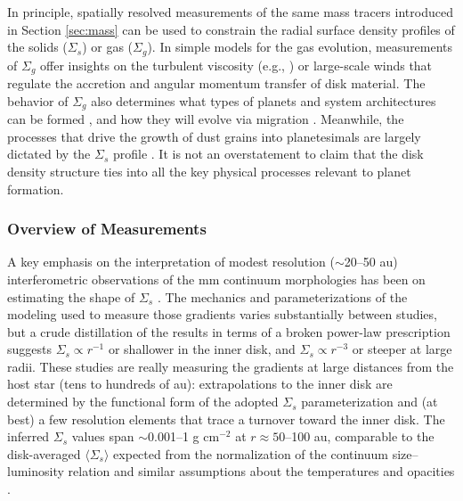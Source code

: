 \documentclass[a4paper]{ar-1col}
\begin{document}
In principle, spatially resolved measurements of the same mass tracers introduced in Section \ref{sec:mass} can be used to constrain the radial surface density profiles of the solids ($\Sigma_s$) or gas ($\Sigma_g$).  In simple models for the gas evolution, measurements of $\Sigma_g$ offer insights on the turbulent viscosity (e.g., \citealt{hartmann98,hueso05}) or large-scale winds \citep[e.g.,][]{blandford82,pudritz83,bai13} that regulate the accretion and angular momentum transfer of disk material.  The behavior of $\Sigma_g$ also determines what types of planets and system architectures can be formed \citep[e.g.,][]{miguel11,alibert13}, and how they will evolve via migration \citep[e.g.,][]{paardekooper10,baruteau11}.  Meanwhile, the processes that drive the growth of dust grains into planetesimals are largely dictated by the $\Sigma_s$ profile \citep[e.g.,][]{garaud07,johansen09,birnstiel12}.  It is not an overstatement to claim that the disk density structure ties into all the key physical processes relevant to planet formation.        

\subsubsection{Overview of Measurements}
A key emphasis on the interpretation of modest resolution ($\sim$20--50 au) interferometric observations of the mm continuum morphologies has been on estimating the shape of $\Sigma_s$ \citep{aw07a,pietu07,pietu14,andrews09,andrews10,isella09}.  The mechanics and parameterizations of the modeling used to measure those gradients varies substantially between studies, but a crude distillation of the results in terms of a broken power-law prescription suggests $\Sigma_s \propto r^{-1}$ or shallower in the inner disk, and $\Sigma_s \propto r^{-3}$ or steeper at large radii.  These studies are really measuring the gradients at large distances from the host star (tens to hundreds of au): extrapolations to the inner disk are determined by the functional form of the adopted $\Sigma_s$ parameterization and (at best) a few resolution elements that trace a turnover toward the inner disk.  The inferred $\Sigma_s$ values span $\sim$0.001--1 g cm$^{-2}$ at $r \approx 50$--100 au, comparable to the disk-averaged $\langle \Sigma_s \rangle$ expected from the normalization of the continuum size--luminosity relation and similar assumptions about the temperatures and opacities \citep{tripathi17}.  
\end{document}
